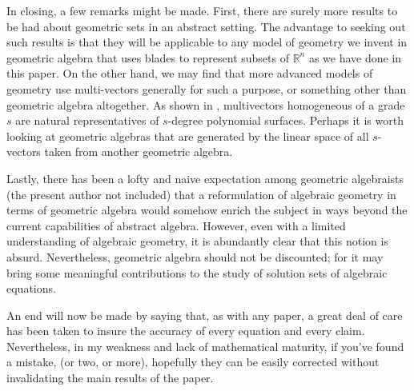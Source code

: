 \documentclass{birkjour}
\theoremstyle{definition}
\theoremstyle{remark}
\numberwithin{equation}{section}
\newcommand{\R}{\mathbb{R}}
\begin{document}
In closing, a few remarks might be made.  First, there are surely more results to be had
about geometric sets in an abstract setting.  The advantage to seeking out such
results is that they will be applicable to any model of geometry we invent
in geometric algebra that uses blades to represent subsets of $\R^n$ as we have
done in this paper.  On the other hand,
we may find that more advanced models of geometry use multi-vectors generally
for such a purpose, or something other than geometric algebra altogether.
As shown in \cite{Parkin13}, multivectors homogeneous of a grade $s$ are
natural representatives of $s$-degree polynomial surfaces.  Perhaps it is
worth looking at geometric algebras that are generated by the linear space
of all $s$-vectors taken from another geometric algebra.

Lastly, there has been a
lofty and naive expectation among geometric algebraists (the present author not included)
that a reformulation of algebraic geometry in terms of geometric algebra would somehow enrich the subject
in ways beyond the current capabilities of abstract algebra.  However, even with a limited understanding
of algebraic geometry, it is abundantly clear that this notion is absurd.  Nevertheless,
geometric algebra should not be discounted; for it may bring some meaningful
contributions to the study of solution sets of algebraic equations.

An end will now be made by saying that, as with any paper, a great deal of care has been taken to insure
the accuracy of every
equation and every claim.  Nevertheless, in my weakness and lack of mathematical maturity,
if you've found a mistake, (or two, or more), hopefully they can be easily
corrected without invalidating the main results of the paper.
\end{document}
